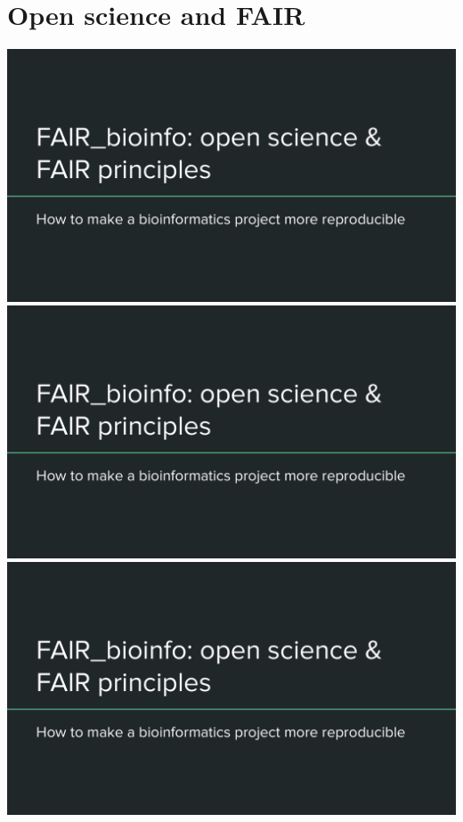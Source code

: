 \section{Open science and FAIR}
\includegraphics[page=10,scale=0.6]{01_OS_and_FAIR_intro.pdf}
\includegraphics[page=11,scale=0.6]{01_OS_and_FAIR_intro.pdf}
\includegraphics[page=13,scale=0.6]{01_OS_and_FAIR_intro.pdf}

